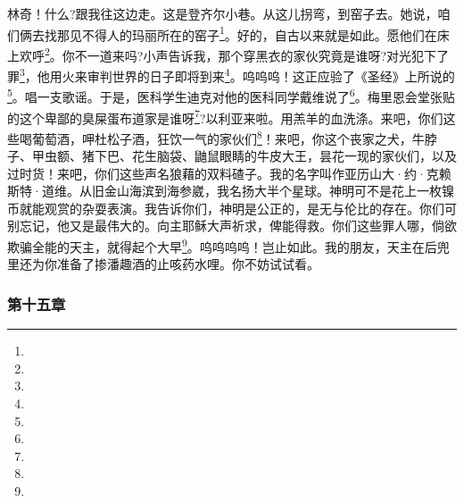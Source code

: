 \par 林奇！什么?跟我往这边走。这是登齐尔小巷。从这儿拐弯，到窑子去。她说，咱们俩去找那见不得人的玛丽所在的窑子\footnote{}。好的，自古以来就是如此。愿他们在床上欢呼\footnote{}。你不一道来吗?小声告诉我，那个穿黑衣的家伙究竟是谁呀?对光犯下了罪\footnote{}，他用火来审判世界的日子即将到来\footnote{}。呜呜呜！这正应验了《圣经》上所说的\footnote{}。唱一支歌谣。于是，医科学生迪克对他的医科同学戴维说了\footnote{}。梅里恩会堂张贴的这个卑鄙的臭屎蛋布道家是谁呀\footnote{}?以利亚来啦。用羔羊的血洗涤。来吧，你们这些喝葡萄酒，呷杜松子酒，狂饮一气的家伙们\footnote{}！来吧，你这个丧家之犬，牛脖子、甲虫额、猪下巴、花生脑袋、鼬鼠眼睛的牛皮大王，昙花一现的家伙们，以及过时货！来吧，你们这些声名狼藉的双料碴子。我的名字叫作亚历山大·约·克赖斯特·道维。从旧金山海滨到海参崴，我名扬大半个星球。神明可不是花上一枚镍币就能观赏的杂耍表演。我告诉你们，神明是公正的，是无与伦比的存在。你们可别忘记，他又是最伟大的。向主耶稣大声祈求，俾能得救。你们这些罪人哪，倘欲欺骗全能的天主，就得起个大早\footnote{}。呜呜呜呜！岂止如此。我的朋友，天主在后兜里还为你准备了掺潘趣酒的止咳药水哩。你不妨试试看。





\subsubsection*{第十五章}

